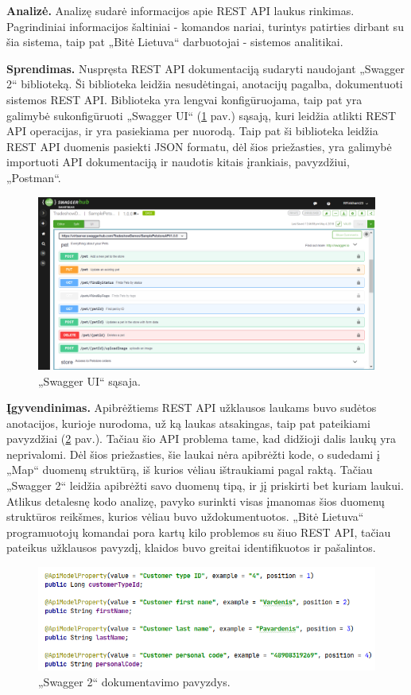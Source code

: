 \textbf{Analizė.}
Analizę sudarė informacijos apie REST API laukus rinkimas. Pagrindiniai informacijos šaltiniai - komandos nariai, turintys patirties dirbant su šia sistema,
taip pat „Bitė Lietuva“ darbuotojai - sistemos analitikai.

\textbf{Sprendimas.}
Nuspręsta REST API dokumentaciją sudaryti naudojant „Swagger 2“ biblioteką. Ši biblioteka leidžia nesudėtingai, anotacijų pagalba, dokumentuoti sistemos REST API.
Biblioteka yra lengvai konfigūruojama, taip pat yra galimybė sukonfigūruoti „Swagger UI“ (\ref{img:swagger} pav.\footnotemark[1]) sąsają,
kuri leidžia atlikti REST API operacijas, ir yra pasiekiama  per nuorodą. Taip pat ši biblioteka leidžia REST API duomenis pasiekti JSON formatu, dėl šios priežasties,
yra galimybė importuoti API dokumentaciją ir naudotis kitais įrankiais, pavyzdžiui, „Postman“.


\begin{figure}[H]
    \centering
    \includegraphics[scale=0.25]{img/swagger.png}
    \caption{„Swagger UI“ sąsaja.}
    \label{img:swagger}
\end{figure}

\textbf{Įgyvendinimas.}
Apibrėžtiems REST API užklausos laukams buvo sudėtos anotacijos, kurioje nurodoma, už ką laukas atsakingas, taip pat pateikiami pavyzdžiai (\ref{img:customer-dto} pav.).
Tačiau šio API problema tame, kad didžioji dalis laukų yra neprivalomi. Dėl šios priežasties, šie laukai nėra apibrėžti kode, o sudedami į „Map“ duomenų struktūrą, iš kurios
vėliau ištraukiami pagal raktą. Tačiau „Swagger 2“ leidžia apibrėžti savo duomenų tipą, ir jį priskirti bet kuriam laukui. Atlikus detalesnę kodo analizę, pavyko surinkti
visas įmanomas šios duomenų struktūros reikšmes, kurios vėliau buvo uždokumentuotos.
„Bitė Lietuva“ programuotojų komandai pora kartų kilo problemos su šiuo REST API, tačiau pateikus užklausos pavyzdį, klaidos buvo greitai identifikuotos ir pašalintos.


\begin{figure}[H]
    \centering
    \includegraphics[scale=0.5]{img/customer-dto.png}
    \caption{„Swagger 2“ dokumentavimo pavyzdys.}
    \label{img:customer-dto}
\end{figure}
